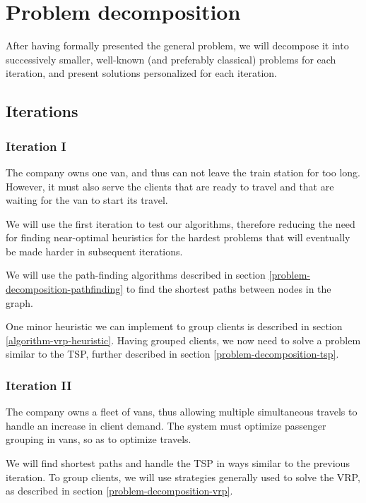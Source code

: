 \chapter{Problem decomposition} \label{problem-decomposition}
After having formally presented the general problem, we will decompose it into successively smaller, well-known (and preferably classical) problems for each iteration, and present solutions personalized for each iteration.

\section{Iterations} \label{problem-decomposition-iterations}
\subsection{Iteration I}
The company owns one van, and thus can not leave the train station for too long. However, it must also serve the clients that are ready to travel and that are waiting for the van to start its travel.\par
We will use the first iteration to test our algorithms, therefore reducing the need for finding near-optimal heuristics for the hardest problems that will eventually be made harder in subsequent iterations.\par
We will use the path-finding algorithms described in section \ref{problem-decomposition-pathfinding} to find the shortest paths between nodes in the graph.\par
One minor heuristic we can implement to group clients is described in section \ref{algorithm-vrp-heuristic}. Having grouped clients, we now need to solve a problem similar to the \acrshort{TSP}, further described in section \ref{problem-decomposition-tsp}.
\subsection{Iteration II}
The company owns a fleet of vans, thus allowing multiple simultaneous travels to handle an increase in client demand. The system must optimize passenger grouping in vans, so as to optimize travels.\par
We will find shortest paths and handle the \acrshort{TSP} in ways similar to the previous iteration. To group clients, we will use strategies generally used to solve the \acrshort{VRP}, as described in section \ref{problem-decomposition-vrp}.
